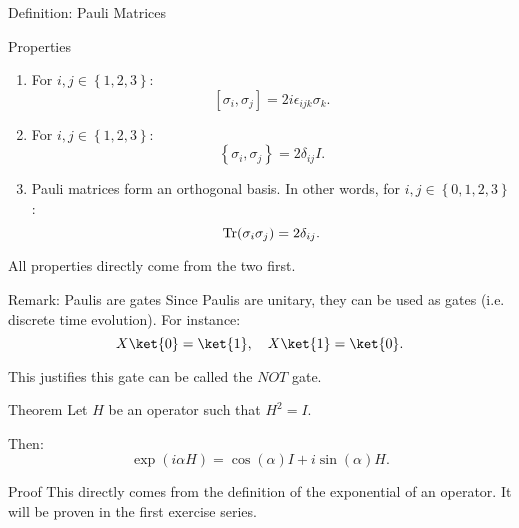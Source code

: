 \documentclass[a4paper]{article}
\begin{document}
\begin{parag}{Definition: Pauli Matrices}
\begin{subparag}{Properties}
\begin{enumerate}[left=0pt]
            \item For $i,j \in \left\{1, 2, 3\right\}$:
            \[\left[\sigma_i, \sigma_j\right] = 2 i \epsilon_{ijk} \sigma_k.\]

            \item For $i, j \in \left\{1, 2, 3\right\}$:
            \[\left\{\sigma_i, \sigma_j\right\} = 2\delta_{ij}I.\]

            \item Pauli matrices form an orthogonal basis. In other words, for $i, j \in \left\{0, 1, 2, 3\right\}$: 
            \[\Tr\left(\sigma_i \sigma_j\right) = 2 \delta_{ij}.\]
            
        \end{enumerate}
        
        All properties directly come from the two first.
    \end{subparag}
\end{parag}

\begin{parag}{Remark: Paulis are gates}
    Since Paulis are unitary, they can be used as gates (i.e. discrete time evolution). For instance: 
    \[X \ket{0} = \ket{1}, \mathspace X \ket{1} = \ket{0}.\]
    
    This justifies this gate can be called the $NOT$ gate.
\end{parag}

\begin{parag}{Theorem}
    Let $H$ be an operator such that $H^2 = I$.

    Then: 
    \[\exp\left(i \alpha H\right) = \cos\left(\alpha\right) I + i \sin\left(\alpha\right) H.\]

    \begin{subparag}{Proof}
        This directly comes from the definition of the exponential of an operator. It will be proven in the first exercise series.
    \end{subparag}
\end{parag}
\end{document}
